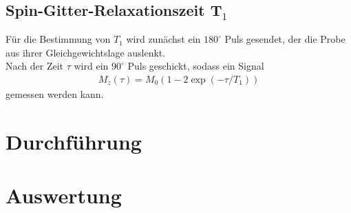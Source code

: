 \documentclass[]{scrartcl}
\begin{document}
\subsection{Spin-Gitter-Relaxationszeit T$_1$}
Für die Bestimmung von $T_1$ wird zunächst ein $180^\circ$ Puls gesendet, der die Probe aus ihrer Gleichgewichtslage auslenkt.\\
Nach der Zeit $\tau$ wird ein $90^\circ$ Puls geschickt, sodass ein Signal 
\begin{align}
M_{z}(\tau)=M_0(1-2\exp(-\tau/T_1))
\label{eq_T1}
\end{align}
gemessen werden kann.
\section{Durchführung}

\section{Auswertung}
\end{document}
